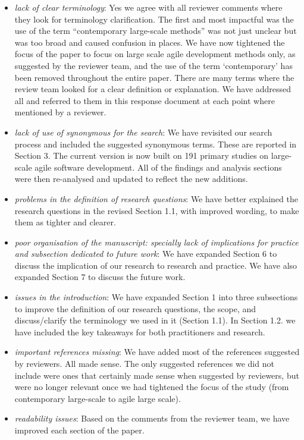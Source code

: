 \documentclass[a4paper,twoside,11pt]{reviewresponse}
\begin{document}
\begin{itemize}
	\item \textit{lack of clear terminology}: Yes we agree with all reviewer comments where they look for terminology clarification. The first and most impactful was the use of the term ``contemporary large-scale methods'' was not just unclear but was too broad and caused confusion in places. We have now tightened the focus of the paper to focus on large scale agile development methods only, as suggested by the reviewer team, and the use of the term `contemporary' has been removed throughout the entire paper. There are many terms where the review team looked for a clear definition or explanation. We have addressed all and referred to them in this response document at each point where mentioned by a reviewer.
	\item \textit{lack of use of synonymous for the search}: We have revisited our search process and included the suggested synonymous terms. These are reported in Section 3. The current version is now built on 191 primary studies on large-scale agile software development. All of the findings and analysis sections were then re-analysed and updated to reflect the new additions.
	\item \textit{problems in the definition of research questions}: We have better explained the research questions in the revised Section 1.1, with improved wording, to make them as tighter and clearer.
	\item \textit{poor organisation of the manuscript: specially lack of implications for practice and subsection dedicated to future work}: We have expanded Section 6 to discuss the implication of our research to research and practice. We have also expanded Section 7 to discuss the future work.
	\item \textit{issues in the introduction}: We have expanded Section 1 into three subsections to improve the definition of our research questions, the scope, and discuss/clarify the terminology we used in it (Section 1.1). In Section 1.2. we have included the key takeaways for both practitioners and research.
	\item \textit{important references missing}: We have added most of the references suggested by reviewers. All made sense. The only suggested references we did not include were ones that certainly made sense when suggested by reviewers, but were no longer relevant once we had tightened the focus of the study (from contemporary large-scale to agile large scale).
	\item \textit{readability issues}: Based on the comments from the reviewer team, we have improved each section of the paper. 
\end{itemize}
\end{document}
